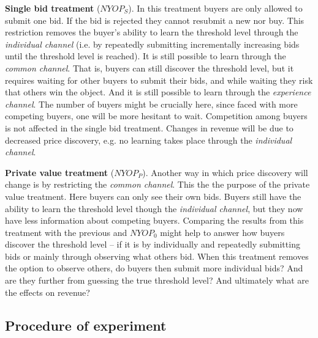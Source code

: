 \documentclass[a4paper,12pt]{article}
\begin{document}
	{\bf Single bid treatment} ($NYOP_S$).
	In this treatment buyers are only allowed to submit one bid. If the bid is rejected they cannot resubmit a new nor buy. This restriction removes the buyer's ability to learn the threshold level through the \emph{individual channel} (i.e. by repeatedly submitting incrementally increasing bids until the threshold level is reached). It is still possible to learn through the \emph{common channel}. That is, buyers can still discover the threshold level, but it requires waiting for other buyers to submit their bids, and while waiting they risk that others win the object. And it is still possible to learn through the \emph{experience channel}. The number of buyers might be crucially here, since faced with more competing buyers, one will be more hesitant to wait. Competition among buyers is not affected in the single bid treatment. Changes in revenue will be due to decreased price discovery, e.g. no learning takes place through the \emph{individual channel}.

	{\bf Private value treatment} ($NYOP_P$).
	Another way in which price discovery will change is by restricting the \emph{common channel}. This the the purpose of the private value treatment. Here buyers can only see their own bids. Buyers still have the ability to learn the threshold level though the \emph{individual channel}, but they now have less information about competing buyers. Comparing the results from this treatment with the previous and $NYOP_0$ might help to answer how buyers discover the threshold level -- if it is by individually and repeatedly submitting bids or mainly through observing what others bid. When this treatment removes the option to observe others, do buyers then submit more individual bids? And are they further from guessing the true threshold level? And ultimately what are the effects on revenue? 
	
	\subsection{Procedure of experiment}
	
\end{document}
